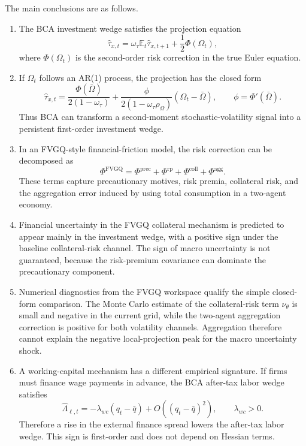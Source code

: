 \documentclass[11pt]{article}
\newcommand{\E}{\mathbb{E}}
\newcommand{\Obar}{\bar\Omega}
\theoremstyle{plain}
\theoremstyle{definition}
\begin{document}
The main conclusions are as follows.
\begin{enumerate}
  \item The BCA investment wedge satisfies the projection equation
  \[
  \hat\tau_{x,t}
  =
  \omega_\tau \E_t\hat\tau_{x,t+1}
  +\frac{1}{2}\Phi(\Omega_t),
  \]
  where $\Phi(\Omega_t)$ is the second-order risk correction in the true Euler
  equation.

  \item If $\Omega_t$ follows an AR(1) process, the projection has the closed
  form
  \[
  \hat\tau_{x,t}
  =
  \frac{\Phi(\Obar)}{2(1-\omega_\tau)}
  +
  \frac{\phi}{2(1-\omega_\tau\rho_\Omega)}
  (\Omega_t-\Obar),
  \qquad
  \phi=\Phi'(\Obar).
  \]
  Thus BCA can transform a second-moment stochastic-volatility signal into a
  persistent first-order investment wedge.

  \item In an FVGQ-style financial-friction model, the risk correction can be
  decomposed as
  \[
  \Phi^{\mathrm{FVGQ}}
  =
  \Phi^{\mathrm{prec}}
  +
  \Phi^{\mathrm{rp}}
  +
  \Phi^{\mathrm{coll}}
  +
  \Phi^{\mathrm{agg}}.
  \]
  These terms capture precautionary motives, risk premia, collateral risk, and
  the aggregation error induced by using total consumption in a two-agent
  economy.

  \item Financial uncertainty in the FVGQ collateral mechanism is predicted to
  appear mainly in the investment wedge, with a positive sign under the
  baseline collateral-risk channel. The sign of macro uncertainty is not
  guaranteed, because the risk-premium covariance can dominate the
  precautionary component.

  \item Numerical diagnostics from the FVGQ workspace qualify the simple
  closed-form comparison. The Monte Carlo estimate of the collateral-risk term
  $\nu_\theta$ is small and negative in the current grid, while the two-agent
  aggregation correction is positive for both volatility channels. Aggregation
  therefore cannot explain the negative local-projection peak for the macro
  uncertainty shock.

  \item A working-capital mechanism has a different empirical signature. If
  firms must finance wage payments in advance, the BCA after-tax labor wedge
  satisfies
  \[
  \hat\Lambda_{\ell,t}
  =
  -\lambda_{wc}(q_t-\bar q)+O((q_t-\bar q)^2),
  \qquad
  \lambda_{wc}>0.
  \]
  Therefore a rise in the external finance spread lowers the after-tax labor
  wedge. This sign is first-order and does not depend on Hessian terms.


\end{enumerate}
\end{document}
